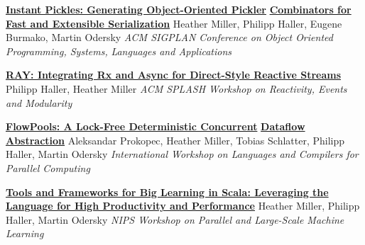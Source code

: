 \documentclass[9pt]{article}
\begin{document}
\noindent\href{http://infoscience.epfl.ch/record/188383}{\bf Instant Pickles: Generating Object-Oriented Pickler}\vspace{-0.03in}
\newline\noindent\href{http://infoscience.epfl.ch/record/188383}{\bf Combinators for Fast and Extensible Serialization}
\newline\noindent Heather Miller, Philipp Haller, Eugene Burmako, Martin Odersky
\newline\noindent\emph{ACM SIGPLAN Conference on Object Oriented Programming, Systems,}
\newline\noindent\emph{Languages and Applications}
\bigskip

\noindent\href{http://infoscience.epfl.ch/record/188383}{\bf RAY: Integrating Rx and Async for Direct-Style Reactive Streams}
\newline\noindent Philipp Haller, Heather Miller
\newline\noindent\emph{ACM SPLASH Workshop on Reactivity, Events and Modularity}
\bigskip

\noindent\href{http://infoscience.epfl.ch/record/180265}{\bf FlowPools: A Lock-Free Deterministic Concurrent}\vspace{-0.03in}
\newline\noindent\href{http://infoscience.epfl.ch/record/180265}{\bf Dataflow Abstraction}
\newline\noindent Aleksandar Prokopec, Heather Miller, Tobias Schlatter,
\newline\noindent Philipp Haller, Martin Odersky
\newline\noindent\emph{International Workshop on Languages and Compilers for Parallel Computing}
\vspace{0.03in}
\newline{}
\vspace{-0.03in}
\newline{}
\vspace{-0.03in}
\newline{}
\bigskip

\noindent\href{http://infoscience.epfl.ch/record/170032}{\bf Tools and Frameworks for Big Learning in Scala: Leveraging the}\vspace{-0.03in}
\newline\noindent\href{http://infoscience.epfl.ch/record/170032}{\bf Language for High Productivity and Performance}
\newline\noindent Heather Miller, Philipp Haller, Martin Odersky
\newline\noindent\emph{NIPS Workshop on Parallel and Large-Scale Machine Learning}
\bigskip
\end{document}
